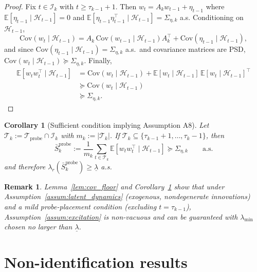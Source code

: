 \documentclass[12pt]{article}
\newcommand{\E}{\mathbb{E}}
\newcommand{\cH}{\mathcal{H}}
\newcommand{\cT}{\mathcal{T}}
\newcommand{\cI}{\mathcal{I}}
\newcommand{\cTprobe}{\mathcal{T}_{\mathrm{probe}}}
\newtheorem{corollary}{Corollary}
\newtheorem{remark}{Remark}
\theoremstyle{plain}
\theoremstyle{definition}
\begin{document}
\begin{proof}
Fix $t \in \cI_k$ with $t \ge \tau_{k-1} + 1$. Then $w_t = A_k w_{t-1} + \eta_{t-1}$ where $\E[\eta_{t-1} \mid \cH_{t-1}] = 0$ and $\E[\eta_{t-1}\eta_{t-1}^\top \mid \cH_{t-1}] = \Sigma_{\eta,k}$ a.s. Conditioning on $\cH_{t-1}$,
\[
\mathrm{Cov}(w_t \mid \cH_{t-1}) = A_k\, \mathrm{Cov}(w_{t-1} \mid \cH_{t-1}) A_k^\top + \mathrm{Cov}(\eta_{t-1} \mid \cH_{t-1}),
\]
and since $\mathrm{Cov}(\eta_{t-1} \mid \cH_{t-1}) = \Sigma_{\eta,k}$ a.s.\ and covariance matrices are PSD,
$\mathrm{Cov}(w_t \mid \cH_{t-1}) \succeq \Sigma_{\eta,k}$.
Finally,
\[
\begin{aligned}
\E[w_t w_t^\top \mid \cH_{t-1}]
&= \mathrm{Cov}(w_t \mid \cH_{t-1})
 + \E[w_t \mid \cH_{t-1}]\, \E[w_t \mid \cH_{t-1}]^\top \\
&\succeq \mathrm{Cov}(w_t \mid \cH_{t-1}) \\
&\succeq \Sigma_{\eta,k}.
\end{aligned}
\]
\qedhere
\end{proof}

\begin{corollary}[Sufficient condition implying Assumption A8]
\label{cor:A8_sufficient}
Let $\cT_k := \cTprobe \cap \cI_k$ with $m_k := |\cT_k|$. If $\cT_k \subseteq \{\tau_{k-1}+1, \dots, \tau_k - 1\}$, then
\[
\bar{S}_k^{\mathrm{probe}} := \frac{1}{m_k}\sum_{t \in \cT_k} \E[w_t w_t^\top \mid \cH_{t-1}] \succeq \Sigma_{\eta,k} \qquad \text{a.s.}
\]
and therefore $\lambda_r(\bar{S}_k^{\mathrm{probe}}) \ge \underline{\lambda}$ a.s.
\end{corollary}

\begin{remark}
Lemma~\ref{lem:cov_floor} and Corollary~\ref{cor:A8_sufficient} show that under Assumption~\ref{assum:latent_dynamics} (exogenous, nondegenerate innovations) and a mild probe-placement condition (excluding $t = \tau_{k-1}$), Assumption~\ref{assum:excitation} is non-vacuous and can be guaranteed with $\lambda_{\min}$ chosen no larger than $\underline{\lambda}$.
\end{remark}


\section{Non-identification results}
\label{sec:non_identification}
\end{document}
